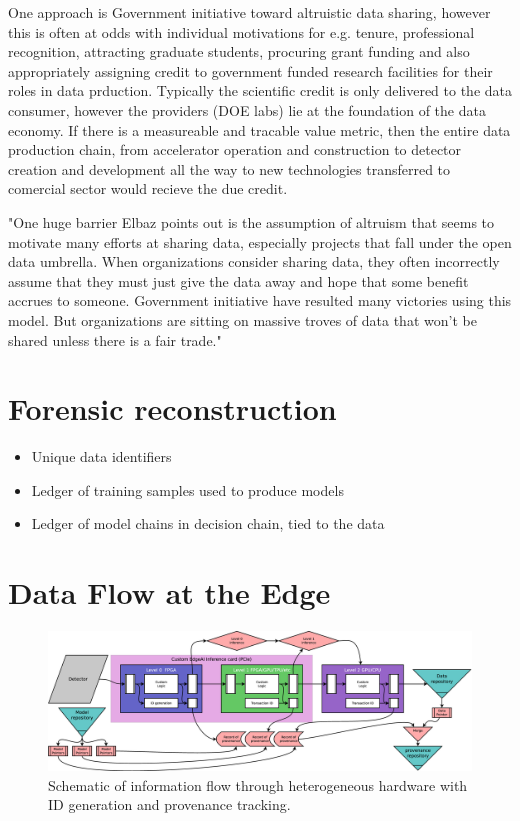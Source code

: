\documentclass{article}
\begin{document}
One approach is Government initiative toward altruistic data sharing, however this is often at odds with individual motivations for e.g. tenure, professional recognition, attracting graduate students, procuring grant funding and also appropriately assigning credit to government funded research facilities for their roles in data prduction.  Typically the scientific credit is only delivered to the data consumer, however the providers (DOE labs) lie at the foundation of the data economy.
If there is a measureable and tracable value metric, then the entire data production chain, from accelerator operation and construction to detector creation and development all the way to new technologies transferred to comercial sector would recieve the due credit.

"One huge barrier Elbaz points out is the assumption of altruism that seems to motivate many
efforts at sharing data, especially projects that fall under the open data umbrella. When
organizations consider sharing data, they often incorrectly assume that they must just give the
data away and hope that some benefit accrues to someone. Government initiative have resulted
many victories using this model. But organizations are sitting on massive troves of data that
won’t be shared unless there is a fair trade."


\section{Forensic reconstruction}
\begin{itemize}
\item Unique data identifiers
\item Ledger of training samples used to produce models
\item Ledger of model chains in decision chain, tied to the data
\end{itemize}

\section{Data Flow at the Edge}
\begin{figure}
	\centerline{\includegraphics[clip,width=\linewidth]{EdgeFlow.eps}}
	\caption{
		\label{fig::EdgeFlow}
		Schematic of information flow through heterogeneous hardware with ID generation and provenance tracking.
		}
\end{figure}


\end{document}
